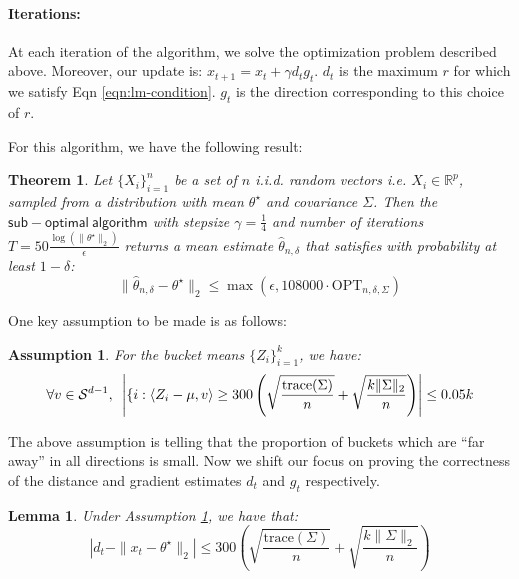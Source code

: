 \documentclass{article}
\newtheorem{theorem}{Theorem}
\newtheorem{lemma}{Lemma}
\newtheorem{assumption}{Assumption}
\theoremstyle{remark}
\theoremstyle{defintiion}
\newcommand{\real}{\mathbb{R}}
\newcommand{\inner}[2]{\left\langle #1, #2 \right\rangle}
\newcommand{\trace}{\mathrm{trace}}
\newcommand{\OPT}{\mathrm{OPT}}
\newcommand{\eparam}{\widehat{\theta}}
\newcommand{\tparam}{\theta^{\star}}
\newcommand{\calS}{\mathcal{S}}
\begin{document}
\paragraph{Iterations:} At each iteration of the algorithm, we solve the optimization problem described above. Moreover, our update is: \(x_{t+1} = x_{t} + \gamma d_{t} g_{t}\). \(d_{t}\) is the maximum \(r\) for which we satisfy Eqn \ref{eqn:lm-condition}. \(g_{t}\) is the direction corresponding to this choice of \(r\).

For this algorithm, we have the following result:
\begin{theorem}
Let \(\{X_{i}\}_{i=1}^{n}\) be a set of \(n\) i.i.d. random vectors i.e. \(X_{i} \in \real^{p}\), sampled from a distribution with mean \(\tparam\) and covariance \(\Sigma\). Then the \(\mathsf{sub-optimal~algorithm}\) with stepsize \(\gamma = \frac{1}{4}\) and number of iterations \(T = 50\frac{\log(\|\tparam\|_{2})}{\epsilon}\) returns a mean estimate \(\eparam_{n, \delta}\) that satisfies with probability at least \(1 - \delta\):
\begin{equation*}
\|\eparam_{n, \delta} - \tparam\|_{2} \leq \max\left(\epsilon, 108000 \cdot \OPT_{n, \delta, \Sigma}\right)
\end{equation*}
\end{theorem}

One key assumption to be made is as follows:
\begin{assumption}
\label{assump:lm}
For the bucket means \(\{Z_{i}\}_{i=1}^{k}\), we have:
\begin{equation*}
\forall v \in \calS^{d-1}, \enskip \left|\{i : \inner{Z_{i} - \mu}{v} \geq 300\left(\sqrt{\frac{\trace(\Sigma)}{n}} + \sqrt{\frac{k\|\Sigma\|_{2}}{n}}\right)\right| \leq 0.05k
\end{equation*}
\end{assumption}

The above assumption is telling that the proportion of buckets which are ``far away'' in all directions is small. Now we shift our focus on proving the correctness of the distance and gradient estimates \(d_{t}\) and \(g_{t}\) respectively.
\begin{lemma}
Under Assumption \ref{assump:lm}, we have that:
\begin{equation*}
\left|d_{t} - \|x_{t} - \tparam\|_{2}\right| \leq 300\left(\sqrt{\frac{\trace(\Sigma)}{n}} + \sqrt{\frac{k\|\Sigma\|_{2}}{n}}\right)
\end{equation*}
\end{lemma}
\end{document}
